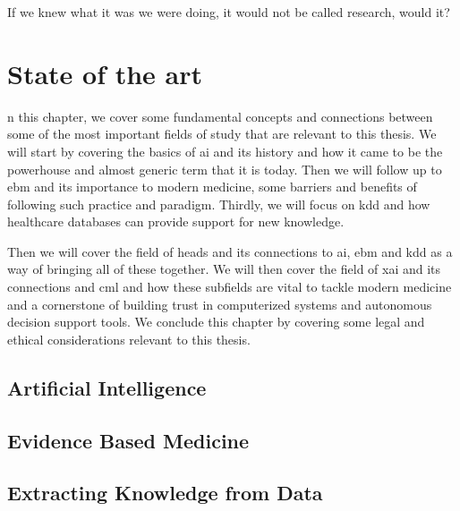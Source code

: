 

\begin{savequote}[75mm]
    If we knew what it was we were doing, it would not be called research, would it?
    \end{savequote}

\chapter{State of the art} \label{chap:sota}


n this chapter, we cover some fundamental concepts and connections between some of the most important fields of study that are relevant to this thesis. We will start by covering the basics of \ac{ai} and its history and how it came to be the powerhouse and almost generic term that it is today. Then we will follow up to \ac{ebm} and its importance to modern medicine, some barriers and benefits of following such practice and paradigm. Thirdly, we will focus on \ac{kdd} and how healthcare databases can provide support for new knowledge.

Then we will cover the field of \ac{heads} and its connections to \ac{ai}, \ac{ebm} and \ac{kdd} as a way of bringing all of these together. We will then cover the field of \ac{xai} and its connections and \ac{cml} and how these subfields are vital to tackle modern medicine and a cornerstone of building trust in computerized systems and autonomous decision support tools. We conclude this chapter by covering some legal and ethical considerations relevant to this thesis.


\section{Artificial Intelligence}\label{sec:ai}


\section{Evidence Based Medicine}\label{sec:ebm}




\section{Extracting Knowledge from Data}\label{sec:kdd}



